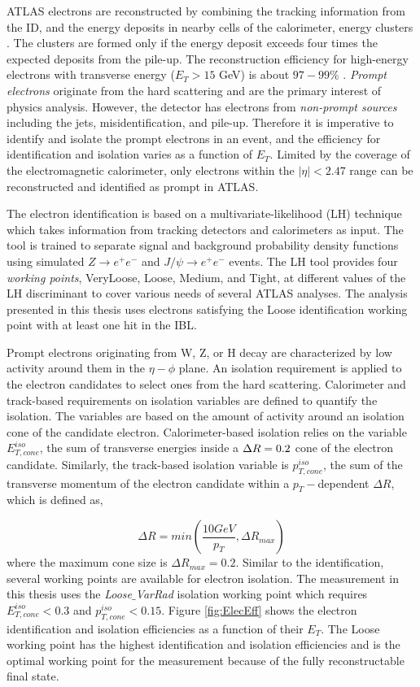 ATLAS electrons are reconstructed by combining the tracking information from the ID, and the energy deposits in nearby cells of the calorimeter,  energy clusters \cite{ElectronReco}. The clusters are formed only if the energy deposit exceeds four times the expected deposits from the pile-up. The reconstruction efficiency for high-energy electrons with transverse energy ($E_{T}>15$ GeV) is about $97-99\%$ \cite{ElectronReco}. \textit{Prompt electrons} originate from the hard scattering and are the primary interest of physics analysis. However, the detector has electrons from \textit{non-prompt sources} including the jets, misidentification, and pile-up. Therefore it is imperative to identify and isolate the prompt electrons in an event, and the efficiency for identification and isolation varies as a function of $E_{T}$. Limited by the coverage of the electromagnetic calorimeter, only electrons within the $|\eta| <2.47$ range can be reconstructed and identified as prompt in ATLAS.

The electron identification is based on a multivariate-likelihood (LH) technique which takes information from tracking detectors and calorimeters as input. The tool is trained to separate signal and background probability density functions using simulated $Z \rightarrow e^{+}e^{-}$ and $J / \psi \rightarrow e^{+}e^{-}$ events. The LH tool provides four \textit{working points}, VeryLoose, Loose, Medium, and Tight, at different values of the LH discriminant to cover various needs of several ATLAS analyses. The analysis presented in this thesis uses electrons satisfying the Loose identification working point with at least one hit in the IBL. 

Prompt electrons originating from W, Z, or H decay are characterized by low activity around them in the $\eta-\phi$ plane. An isolation requirement is applied to the electron candidates to select ones from the hard scattering. Calorimeter and track-based requirements on isolation variables are defined to quantify the isolation. The variables are based on the amount of activity around an isolation cone of the candidate electron. Calorimeter-based isolation relies on the variable $E_{T,cone}^{iso}$, the sum of transverse energies inside a $\Delta R=0.2$ cone of the electron candidate. Similarly, the track-based isolation variable is $p_{T,cone}^{iso}$, the sum of the transverse momentum of the electron candidate within a $p_{T}-$dependent $\Delta R$, which is defined as, 

\begin{equation}
\Delta R = min \left( \frac{10 GeV}{p_{T}},\Delta R_{max} \right)
\end{equation}
where the maximum cone size is $\Delta R_{max} = 0.2$. Similar to the identification, several working points are available for electron isolation. The measurement in this thesis uses the \textit{Loose$\_$VarRad} isolation working point which requires $E_{T,cone}^{iso} < 0.3$ and $p_{T,cone}^{iso} < 0.15$. Figure \ref{fig:ElecEff} shows the electron identification and isolation efficiencies as a function of their $E_{T}$. The Loose working point has the highest identification and isolation efficiencies and is the optimal working point for the measurement because of the fully reconstructable final state.

